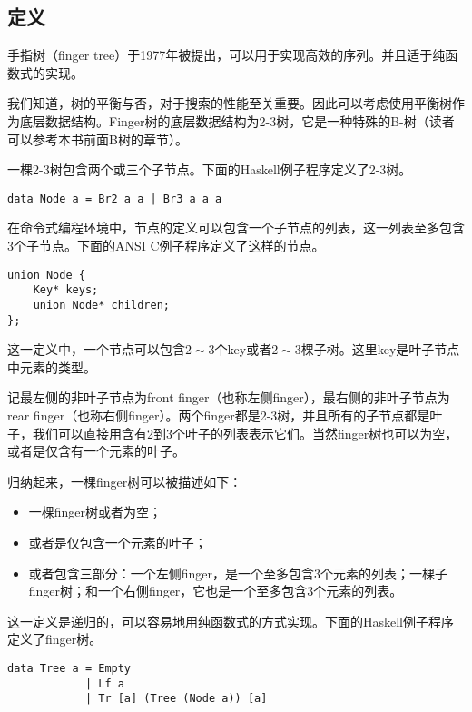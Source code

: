 \documentclass[UTF8]{article}
\begin{document}
\subsection{定义}
手指树（finger tree）\cite{finger-tree-1977}于1977年被提出，可以用于实现高效的序列。并且适于纯函数式的实现\cite{finger-tree-2006}。

我们知道，树的平衡与否，对于搜索的性能至关重要。因此可以考虑使用平衡树作为底层数据结构。Finger树的底层数据结构为2-3树，它是一种特殊的B-树（读者可以参考本书前面B树的章节）。

一棵2-3树包含两个或三个子节点。下面的Haskell例子程序定义了2-3树。

\lstset{language=Haskell}
\begin{lstlisting}[style=Haskell]
data Node a = Br2 a a | Br3 a a a
\end{lstlisting}

在命令式编程环境中，节点的定义可以包含一个子节点的列表，这一列表至多包含3个子节点。下面的ANSI C例子程序定义了这样的节点。

\lstset{language=C}
\begin{lstlisting}
union Node {
    Key* keys;
    union Node* children;
};
\end{lstlisting}

这一定义中，一个节点可以包含$2 \sim 3$个key或者$2 \sim 3$棵子树。这里key是叶子节点中元素的类型。

记最左侧的非叶子节点为front finger（也称左侧finger），最右侧的非叶子节点为rear finger（也称右侧finger）。两个finger都是2-3树，并且所有的子节点都是叶子，我们可以直接用含有2到3个叶子的列表表示它们。当然finger树也可以为空，或者是仅含有一个元素的叶子。

归纳起来，一棵finger树可以被描述如下：

\begin{itemize}
\item 一棵finger树或者为空；
\item 或者是仅包含一个元素的叶子；
\item 或者包含三部分：一个左侧finger，是一个至多包含3个元素的列表；一棵子finger树；和一个右侧finger，它也是一个至多包含3个元素的列表。
\end{itemize}

这一定义是递归的，可以容易地用纯函数式的方式实现。下面的Haskell例子程序定义了finger树。

\lstset{language=Haskell}
\begin{lstlisting}[style=Haskell]
data Tree a = Empty
            | Lf a
            | Tr [a] (Tree (Node a)) [a]
\end{lstlisting}
\end{document}
